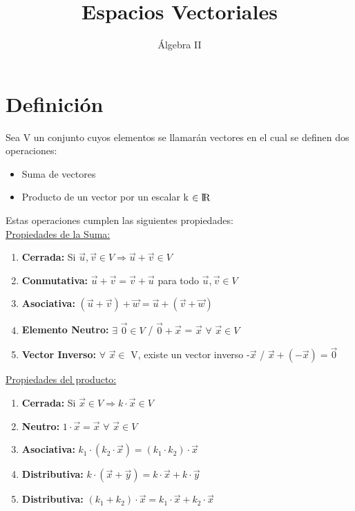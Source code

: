 \documentclass[11pt]{article}
\title{Espacios Vectoriales}
\author{Álgebra II}
\date{\vspace{-5ex}}
\begin{document}
\maketitle{}
\section{Definición}
Sea V un conjunto cuyos elementos se llamarán vectores en
el cual se definen dos operaciones:
\begin{itemize}
\item Suma de vectores
\item Producto de un vector por un escalar k $\in {\rm I\!R}$\
\end{itemize}
Estas operaciones cumplen las siguientes propiedades:\\
\underline {Propiedades de la Suma:}
\begin{enumerate}
\item {\bfseries Cerrada:} Si $\vec{u}, \vec{v} \in V \Rightarrow \vec{u}+\vec{v} \in V$
\item {\bfseries Conmutativa:} $\vec{u} + \vec{v} = \vec{v} + \vec{u}$ para todo $\vec{u}, \vec{v} \in V $ 
\item {\bfseries Asociativa:} $(\vec{u}+\vec{v})+\vec{w} = \vec{u}+(\vec{v}+\vec{w})$
\item {\bfseries Elemento Neutro:} $\exists$ $\vec{0} \in V$ / $\vec{0} + \vec{x}$ = $\vec{x}$ $\forall$ $\vec{x}  \in V$
\item {\bfseries Vector Inverso:} $\forall$ $\vec{x} \in$ V, existe un vector inverso -$\vec{x}$ / $\vec{x}+(-\vec{x})=\vec{0}$
\end{enumerate}
\underline{Propiedades del producto:}
\begin{enumerate}
\item {\bfseries Cerrada:} Si $\vec{x} \in V \Rightarrow k\cdot\vec{x} \in V$
\item {\bfseries Neutro:} $1\cdot\vec{x} = \vec{x}$ $\forall$ $\vec{x} \in V $ 
\item {\bfseries Asociativa:} $k_{1}\cdot(k_{2} \cdot \vec{x} ) = (k_{1} \cdot k_{2})\cdot\vec{x}$
\item {\bfseries Distributiva:} $k  \cdot (\vec{x} + \vec{y}) = k \cdot \vec{x} + k \cdot \vec{y} $
\item {\bfseries Distributiva:} $(k_{1} + k_{2})\cdot \vec{x} = k_{1}\cdot\vec{x} + k_{2}\cdot\vec{x}$
\end{enumerate}
\end{document}
